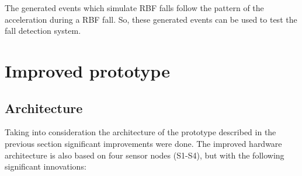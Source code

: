 \documentclass[journal]{IEEEtran}
\begin{document}
The generated events which simulate RBF falls follow the pattern of the acceleration during a RBF fall.
So, these generated events can be used to test the fall detection system.

\section{Improved prototype}
\label{sec:improvedprototype}

\subsection{Architecture}
\label{sub:improvedprototypearchitecture}

Taking into consideration the architecture of the prototype described in the previous 
section significant improvements were done. The improved hardware architecture is also 
based on four sensor nodes (S1-S4), but with the following significant innovations:
\end{document}
